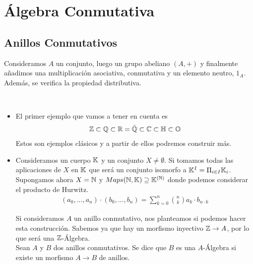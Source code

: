 \chapter{Álgebra Conmutativa}

\section{Anillos Conmutativos}

Consideramos $A$ un conjunto, luego un grupo abeliano $(A,+)$ y finalmente añadimos una multiplicación 
asociativa, conmutativa y un elemento neutro, $1_A$. Además, se verifica la propiedad distributiva.

\begin{ejemplo}\
    \begin{itemize}
        \item El primer ejemplo que vamos a tener en cuenta es
        \begin{gather*}
            \mathbb{Z}\subset \mathbb{Q} \subset \mathbb{R} = \bar{\mathbb{Q}} \subset \mathbb{C} \subset \mathbb{H} \subset \mathbb{O}
        \end{gather*}
        Estos son ejemplos clásicos y a partir de ellos podremos construir más.

        \item Consideramos un cuerpo $\mathbb{K}$ y un conjunto $X\neq \emptyset$. Si tomamos todas las aplicaciones de $X$ en $\mathbb{K}$ que será un conjunto isomorfo a $\mathbb{K}^I = \Pi_{i\in I} \mathbb{K}_i$.\\
        
        Supongamos ahora $X=\mathbb{N}$ y $Maps(\mathbb{N}, \mathbb{K}) \supseteq \mathbb{K}^{(\mathbb{N})}$ donde podemos considerar el producto de Hurwitz.
        \begin{gather*}
            (a_0, ..., a_n) \cdot (b_0, ..., b_n) = \sum_{k=0}^{n} \binom{n}{k} a_k \cdot b_{n\cdot k}
        \end{gather*}


        Si consideramos $A$ un anillo conmutativo, nos planteamos si podemos hacer esta construcción. Sabemos ya que hay un morfismo inyectivo $\mathbb{Z} \to A$, por lo que será una $\mathbb{Z}$-Álgebra.\\

        Sean $A$ y $B$ dos anillos conmutativos. Se dice que $B$ es una $A$-Álgebra si existe un morfismo $A\to B$ de anillos.\\


\end{itemize}
\end{ejemplo}
